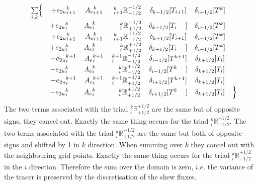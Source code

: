 \begin{align*}
 \begin{matrix}  
&\sum\limits_{i,k}   \Bigl\{ 
  &+{e_{2u}}_{i+1}^{k}                             &{A_{e}}_{i+1    }^{k} 
  &\ {_{i+1}^k \mathbb{R}_{- 1/2}^{-1/2}} &\delta_{k-1/2}[T_{i+1}]    &\delta_{i+1/2}[T^{k}]   &\\
&&+{e_{2u}}_i^{k\ \ \ \:}                            &{A_{e}}_{i}^{k\ \ \ \:}      
  &\ {\ \ \;_i^k \mathbb{R}_{+1/2}^{-1/2}}  &\delta_{k-1/2}[T_{i\ \ \ \;}]  &\delta_{i+1/2}[T^{k}] &\\
&&+{e_{2u}}_{i+1}^{k}                             &{A_{e}}_{i+1    }^{k} 
  &\ {_{i+1}^k \mathbb{R}_{- 1/2}^{+1/2}} &\delta_{k+1/2}[T_{i+1}]     &\delta_{i+1/2}[T^{k}] &\\
&&+{e_{2u}}_i^{k\ \ \ \:}                            &{A_{e}}_{i}^{k\ \ \ \:}       
    &\ {\ \ \;_i^k \mathbb{R}_{+1/2}^{+1/2}} &\delta_{k+1/2}[T_{i\ \ \ \;}] &\delta_{i+1/2}[T^{k}] &\\
%
&&-{e_{2u}}_i^{k+1}                                &{A_{e}}_i^{k+1} 
  &{_i^{k+1} \mathbb{R}_{-1/2}^{- 1/2}}   &\delta_{i-1/2}[T^{k+1}]      &\delta_{k+1/2}[T_{i}] &\\   
&&-{e_{2u}}_i^{k\ \ \ \:}                             &{A_{e}}_i^{k\ \ \ \:} 
  &{\ \ \;_i^k  \mathbb{R}_{-1/2}^{+1/2}}   &\delta_{i-1/2}[T^{k\ \ \ \:}]  &\delta_{k+1/2}[T_{i}] &\\
&&-{e_{2u}}_i^{k+1    }                             &{A_{e}}_i^{k+1} 
  &{_i^{k+1} \mathbb{R}_{+1/2}^{- 1/2}}   &\delta_{i+1/2}[T^{k+1}]      &\delta_{k+1/2}[T_{i}] &\\   
&&-{e_{2u}}_i^{k\ \ \ \:}                             &{A_{e}}_i^{k\ \ \ \:} 
  &{\ \ \;_i^k  \mathbb{R}_{+1/2}^{+1/2}}   &\delta_{i+1/2}[T^{k\ \ \ \:}]  &\delta_{k+1/2}[T_{i}] 
&\Bigr\}  \\
\end{matrix}   
\end{align*}
The two terms associated with the triad ${_i^k \mathbb{R}_{+1/2}^{+1/2}}$ are the 
same but of opposite signs, they cancel out. 
Exactly the same thing occurs for the triad ${_i^k \mathbb{R}_{-1/2}^{-1/2}}$. 
The two terms associated with the triad ${_i^k \mathbb{R}_{+1/2}^{-1/2}}$ are the 
same but both of opposite signs and shifted by 1 in $k$ direction. When summing over $k$ 
they cancel out with the neighbouring grid points. 
Exactly the same thing occurs for the triad ${_i^k \mathbb{R}_{-1/2}^{+1/2}}$ in the 
$i$ direction. Therefore the sum over the domain is zero, $i.e.$ the variance of the 
tracer is preserved by the discretisation of the skew fluxes.

